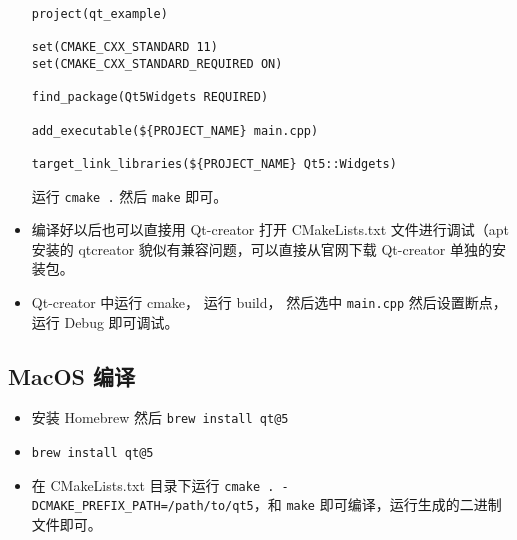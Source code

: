 \begin{itemize}
\begin{lstlisting}[language=none,caption=CMakeLists.txt]
project(qt_example)

set(CMAKE_CXX_STANDARD 11)
set(CMAKE_CXX_STANDARD_REQUIRED ON)

find_package(Qt5Widgets REQUIRED)

add_executable(${PROJECT_NAME} main.cpp)

target_link_libraries(${PROJECT_NAME} Qt5::Widgets)
\end{lstlisting}
运行 \verb|cmake .| 然后 \verb|make| 即可。
\item 编译好以后也可以直接用 Qt-creator 打开 CMakeLists.txt 文件进行调试（apt 安装的 qtcreator 貌似有兼容问题，可以直接从官网下载 Qt-creator 单独的安装包。
\item Qt-creator 中运行 cmake， 运行 build， 然后选中 \verb|main.cpp| 然后设置断点， 运行 Debug 即可调试。
\end{itemize}

\subsection{MacOS 编译}
\begin{itemize}
\item 安装 Homebrew 然后 \verb`brew install qt@5`
\item \verb`brew install qt@5`
\item 在 CMakeLists.txt 目录下运行 \verb`cmake . -DCMAKE_PREFIX_PATH=/path/to/qt5`，和 \verb`make` 即可编译，运行生成的二进制文件即可。
\end{itemize}

